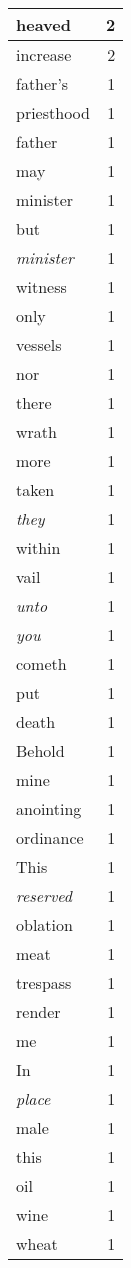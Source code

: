 \begin{center}
\begin{longtable}{l|r}
heaved & 2 \\ \hline
increase & 2 \\ \hline
father's & 1 \\ \hline
priesthood & 1 \\ \hline
father & 1 \\ \hline
may & 1 \\ \hline
minister & 1 \\ \hline
but & 1 \\ \hline
\emph{minister} & 1 \\ \hline
witness & 1 \\ \hline
only & 1 \\ \hline
vessels & 1 \\ \hline
nor & 1 \\ \hline
there & 1 \\ \hline
wrath & 1 \\ \hline
more & 1 \\ \hline
taken & 1 \\ \hline
\emph{they} & 1 \\ \hline
within & 1 \\ \hline
vail & 1 \\ \hline
\emph{unto} & 1 \\ \hline
\emph{you} & 1 \\ \hline
cometh & 1 \\ \hline
put & 1 \\ \hline
death & 1 \\ \hline
Behold & 1 \\ \hline
mine & 1 \\ \hline
anointing & 1 \\ \hline
ordinance & 1 \\ \hline
This & 1 \\ \hline
\emph{reserved} & 1 \\ \hline
oblation & 1 \\ \hline
meat & 1 \\ \hline
trespass & 1 \\ \hline
render & 1 \\ \hline
me & 1 \\ \hline
In & 1 \\ \hline
\emph{place} & 1 \\ \hline
male & 1 \\ \hline
this & 1 \\ \hline
oil & 1 \\ \hline
wine & 1 \\ \hline
wheat & 1 \\ \hline

\end{longtable}
\end{center}
